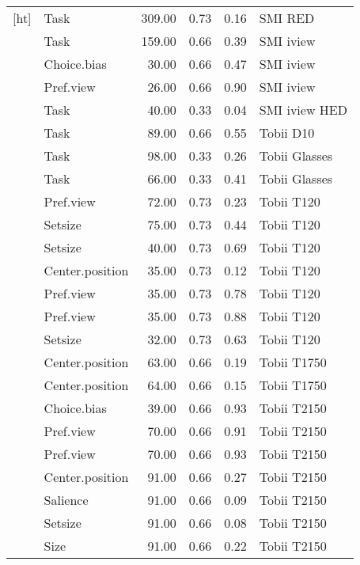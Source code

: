 \begin{longtable}{llrrrl}[ht]
  \cite{vanherpen2011} & Task & 309.00 & 0.73 & 0.16 & SMI RED \\ 
  \cite{keller2014} & Task & 159.00 & 0.66 & 0.39 & SMI iview \\ 
  \cite{lindner2014} & Choice.bias & 30.00 & 0.66 & 0.47 & SMI iview \\ 
  \cite{lindner2014} & Pref.view & 26.00 & 0.66 & 0.90 & SMI iview \\ 
  \cite{gidlof2013} & Task & 40.00 & 0.33 & 0.04 & SMI iview HED \\ 
  \cite{turner2014} & Task & 89.00 & 0.66 & 0.55 & Tobii D10 \\ 
  \cite{wastlund2015} & Task & 98.00 & 0.33 & 0.26 & Tobii Glasses \\ 
  \cite{wastlund2015} & Task & 66.00 & 0.33 & 0.41 & Tobii Glasses \\ 
  \cite{du2014} & Pref.view & 72.00 & 0.73 & 0.23 & Tobii T120 \\ 
  \cite{hong2016a} & Setsize & 75.00 & 0.73 & 0.44 & Tobii T120 \\ 
  \cite{meissner2016b} & Setsize & 40.00 & 0.73 & 0.69 & Tobii T120 \\ 
  \cite{meissner2016a} & Center.position & 35.00 & 0.73 & 0.12 & Tobii T120 \\ 
  \cite{meissner2016a} & Pref.view & 35.00 & 0.73 & 0.78 & Tobii T120 \\ 
  \cite{meissner2016a} & Pref.view & 35.00 & 0.73 & 0.88 & Tobii T120 \\ 
  \cite{spinks2016a} & Setsize & 32.00 & 0.73 & 0.63 & Tobii T120 \\ 
  \cite{atalay2012a} & Center.position & 63.00 & 0.66 & 0.19 & Tobii T1750 \\ 
  \cite{atalay2012a} & Center.position & 64.00 & 0.66 & 0.15 & Tobii T1750 \\ 
  \cite{krajbich2010a} & Choice.bias & 39.00 & 0.66 & 0.93 & Tobii T2150 \\ 
  \cite{meissner2016a} & Pref.view & 70.00 & 0.66 & 0.91 & Tobii T2150 \\ 
  \cite{meissner2016a} & Pref.view & 70.00 & 0.66 & 0.93 & Tobii T2150 \\ 
  \cite{orquin2019a} & Center.position & 91.00 & 0.66 & 0.27 & Tobii T2150 \\ 
  \cite{orquin2019a} & Salience & 91.00 & 0.66 & 0.09 & Tobii T2150 \\ 
  \cite{orquin2019a} & Setsize & 91.00 & 0.66 & 0.08 & Tobii T2150 \\ 
  \cite{orquin2019a} & Size & 91.00 & 0.66 & 0.22 & Tobii T2150 \\ 

\end{longtable}
